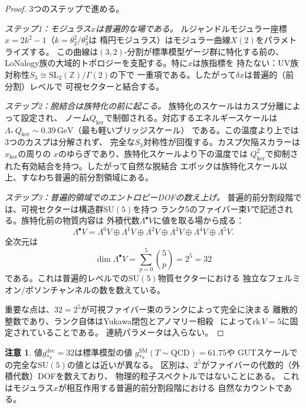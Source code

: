 \documentclass[12pt]{article}
\theoremstyle{plain}
\theoremstyle{definition}
\newtheorem{remark}[theorem]{注意}
\numberwithin{equation}{section}
\newcommand{\Z}{\mathbb{Z}}
\newcommand{\kker}{\mathrm{ker}}
\newcommand{\dec}{\mathrm{dec}}
\begin{document}
\begin{proof}
3つのステップで進める。

\emph{ステップ1：モジュラス$x$は普遍的な場である。}
ルジャンドルモジュラー座標$x=2k^2-1$（$k=\theta_2^2/\theta_3^2$は
楕円モジュラス）はモジュラー曲線$X(2)$をパラメトライズする。
この曲線は$(3,2)$-分割が標準模型ゲージ群に特化する前の、
LoNalogy族の大域的トポロジーを支配する。特に$x$は族指標を
持たない：UV族対称性$S_3\cong\mathrm{SL}_2(\Z)/\Gamma(2)$の下で
一重項である。したがって$\delta x$は普遍的（前分割）レベルで
可視セクターと結合する。

\emph{ステップ2：脱結合は族特化の前に起こる。}
族特化のスケールはカスプ分離によって設定され、
ノーム$Q_{\kker}$で制御される。対応するエネルギースケールは
$\Lambda_*\,Q_{\kker}\sim0.39\,\mathrm{GeV}$（最も軽いブリッジスケール）
である。この温度より上では3つのカスプは分解されず、
完全な$S_3$対称性が回復する。カスプ欠陥スカラーは$x_{\kker}$の周りの
$x$のゆらぎであり、族特化スケールより下の温度では
$Q_{\kker}^2$で抑制された有効結合を持つ。したがって自然な脱結合
エポックは族特化スケール以上、すなわち普遍的前分割領域にある。

\emph{ステップ3：普遍的領域でのエントロピーDOFの数え上げ。}
普遍的前分割段階では、可視セクターは構造群$\mathrm{SU}(5)$を持つ
ランク5のファイバー束$V$で記述される。族特化前の物質内容は
外積代数$\Lambda^\bullet V$に値を取る場から成る：
\begin{equation}
\Lambda^\bullet V = \Lambda^0 V\oplus\Lambda^1 V\oplus\Lambda^2 V
\oplus\Lambda^3 V\oplus\Lambda^4 V\oplus\Lambda^5 V.
\end{equation}
全次元は
\begin{equation}
\dim\Lambda^\bullet V = \sum_{p=0}^{5}\binom{5}{p} = 2^5 = 32
\end{equation}
である。これは普遍的レベルでの$\mathrm{SU}(5)$物質セクターにおける
独立なフェルミオン/ボソンチャンネルの数を数えている。

重要な点は、$32=2^5$が可視ファイバー束のランクによって完全に決まる
離散的整数であり、ランク自体はYukawa閉包とアノマリー相殺~\cite{YMmassGap}
によって$\mathrm{rk}\,V=5$に固定されていることである。
連続パラメータは入らない。
\end{proof}

\begin{remark}
値$g_{*s}^{\dec}=32$は標準模型の値
$g_{*s}^{\mathrm{SM}}(T\sim\mathrm{QCD})=61.75$や
GUTスケールでの完全な$\mathrm{SU}(5)$の値とは近いが異なる。
区別は、$2^5$がファイバーの代数的（外積代数）DOFを数えており、
物理的粒子スペクトルではないことにある。
これはモジュラス$x$が相互作用する普遍的前分割段階における
自然なカウントである。
\end{remark}
\end{document}
